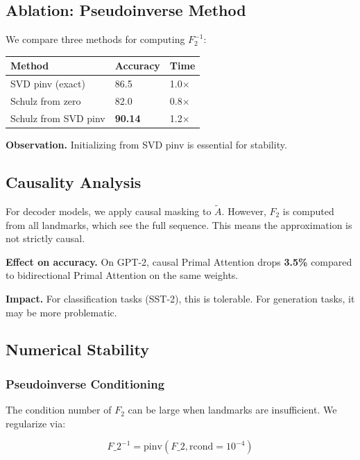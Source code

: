 \subsection{Ablation: Pseudoinverse Method}

We compare three methods for computing $F_2^{-1}$:

\begin{table}[H]
\centering
\small
\begin{tabular}{lll}
\toprule
\textbf{Method} & \textbf{Accuracy} & \textbf{Time} \\
\midrule
SVD pinv (exact) & 86.5 & 1.0$\times$ \\
Schulz from zero & 82.0 & 0.8$\times$ \\
Schulz from SVD pinv & \textbf{90.14} & 1.2$\times$ \\
\bottomrule
\end{tabular}
\end{table}

\textbf{Observation.} Initializing from SVD pinv is essential for stability.

\subsection{Causality Analysis}

For decoder models, we apply causal masking to $\tilde{A}$. However, 
$F_2$ is computed from all landmarks, which see the full sequence. This 
means the approximation is not strictly causal.

\textbf{Effect on accuracy.} On GPT-2, causal Primal Attention drops 
\textbf{3.5\%} compared to bidirectional Primal Attention on the 
same weights.

\textbf{Impact.} For classification tasks (SST-2), this is tolerable. For 
generation tasks, it may be more problematic.

\subsection{Numerical Stability}

\subsubsection{Pseudoinverse Conditioning}

The condition number of $F_2$ can be large when landmarks are 
insufficient. We regularize via:

\[
F\_2^{-1} = \text{pinv}(F\_2, \text{rcond}=10^{-4})
\]

